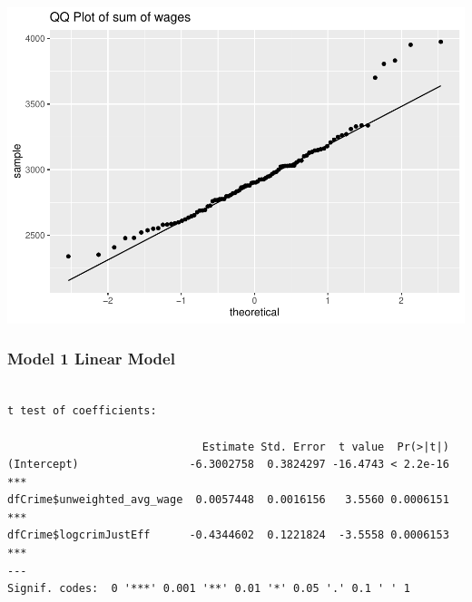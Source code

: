 \documentclass[]{article}
\newenvironment{Shaded}{}{}
\newcommand{\DataTypeTok}[1]{#1}
\newcommand{\DecValTok}[1]{#1}
\newcommand{\KeywordTok}[1]{\textcolor[rgb]{0.00,0.00,1.00}{#1}}
\newcommand{\NormalTok}[1]{#1}
\newcommand{\OperatorTok}[1]{#1}
\newcommand{\StringTok}[1]{\textcolor[rgb]{0.00,0.50,0.50}{#1}}
\begin{document}
\includegraphics{Bagnard_Gaustad_Hartman_Leung_Lab_3_files/figure-latex/unnamed-chunk-74-2.pdf}

\hypertarget{model-1-linear-model}{%
\subsubsection{Model 1 Linear Model}\label{model-1-linear-model}}

\begin{Shaded}
\end{Shaded}

\begin{verbatim}

t test of coefficients:

                              Estimate Std. Error  t value  Pr(>|t|)    
(Intercept)                 -6.3002758  0.3824297 -16.4743 < 2.2e-16 ***
dfCrime$unweighted_avg_wage  0.0057448  0.0016156   3.5560 0.0006151 ***
dfCrime$logcrimJustEff      -0.4344602  0.1221824  -3.5558 0.0006153 ***
---
Signif. codes:  0 '***' 0.001 '**' 0.01 '*' 0.05 '.' 0.1 ' ' 1
\end{verbatim}
\end{document}
